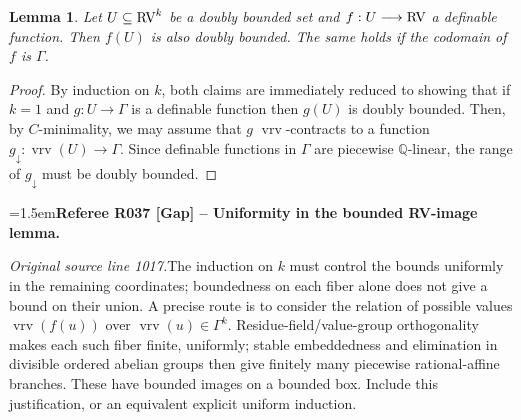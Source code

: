 \documentclass[12pt]{amsart}
\newcommand{\RefereeRemark}[4]{%
  \par\medskip\begingroup\normalfont\small\color{RefereePurple}%
  \emergencystretch=1.5em\noindent\textbf{Referee R#1 [#2] -- #3.}\par\nobreak\noindent #4\par
  \endgroup\medskip
}
\theoremstyle{plain}
\newtheorem{lem}[thm]{Lemma}
\theoremstyle{definition}
\theoremstyle{remark}
\numberwithin{equation}{section}
\theoremstyle{plain}
\newcommand{\RV}{\textup{RV}}
\newcommand{\Q}{\mathds{Q}}
\newcommand{\cmin}{$C$\nobreakdash}
\newcommand{\0}{\emptyset}
\newcommand{\fun}{\longrightarrow}
\newcommand{\sub}{\subseteq}
\DeclareMathOperator{\vrv}{vrv}
\begin{document}
\begin{lem}\label{db:to:db}
Let $U \sub \RV^k$ be a doubly bounded set and $f: U \fun \RV$ a definable function. Then $f(U)$ is also doubly bounded. The same holds if the codomain of $f$ is $\Gamma$.
\end{lem}
\begin{proof}
By induction on $k$, both claims are immediately reduced to showing that if $k=1$  and $g : U \fun \Gamma$ is a definable function then $g(U)$ is doubly bounded. Then, by \cmin-minimality, we may assume that $g$  $\vrv$-contracts to a function $g_{\downarrow} : \vrv(U) \fun \Gamma$. Since definable functions in $\Gamma$ are piecewise $\Q$-linear, the range of $g_{\downarrow}$ must be doubly bounded.
\end{proof}

\RefereeRemark{037}{Gap}{Uniformity in the bounded RV-image lemma}{%
\textit{Original source line 1017.}\quad The induction on $k$ must control the bounds uniformly in the remaining coordinates; boundedness on each fiber alone does not give a bound on their union. A precise route is to consider the relation of possible values $\vrv(f(u))$ over $\vrv(u)\in\Gamma^k$. Residue-field/value-group orthogonality makes each such fiber finite, uniformly; stable embeddedness and elimination in divisible ordered abelian groups then give finitely many piecewise rational-affine branches. These have bounded images on a bounded box. Include this justification, or an equivalent explicit uniform induction.
}
\end{document}
